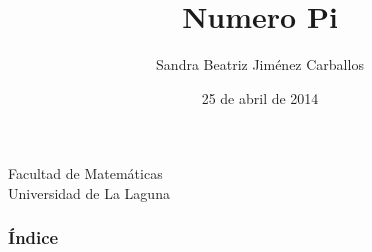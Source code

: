 \documentclass{beamer}
\title[Número Pi]{Numero Pi}
\author[Sandra Beatriz Jiménez Carballos]{Sandra Beatriz Jiménez Carballos}
\date[25-04-2014]{25 de abril de 2014}
\begin{document}
  
\begin{frame}

  \hspace*{7.0cm}
  \titlepage

  \begin{small}
    \begin{center}
     Facultad de Matemáticas \\
     Universidad de La Laguna
    \end{center}
  \end{small}

\end{frame}

\begin{frame}
  \frametitle{Índice}  
  \tableofcontents[pausesections]
\end{frame}
\end{document}
